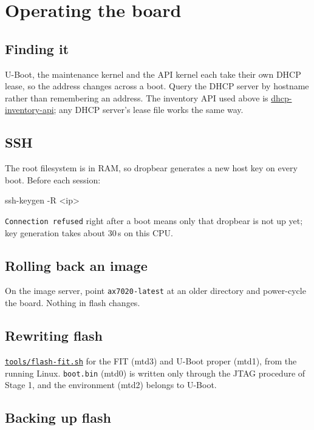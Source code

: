 \documentclass[11pt,a4paper,oneside]{article}
\newcommand{\file}[1]{{\color{bluemid}\nolinkurl{#1}}}
\newcommand{\cmd}[1]{\texttt{#1}}
\newcommand{\repo}{https://github.com/MaxClerkwell/ax7020-bringup}
\newcommand{\rfile}[1]{\href{\repo/blob/master/#1}{\color{bluemid}\nolinkurl{#1}}}
\begin{document}
\section{Operating the board}

\subsection{Finding it}

U-Boot, the maintenance kernel and the API kernel each take their own DHCP
lease, so the address changes across a boot. Query the DHCP server by
hostname rather than remembering an address. The inventory API used above is
\href{https://github.com/MaxClerkwell/dhcp-inventory-api}{dhcp-inventory-api};
any DHCP server's lease file works the same way.

\subsection{SSH}

The root filesystem is in RAM, so dropbear generates a new host key on every
boot. Before each session:

\begin{shell}
ssh-keygen -R <ip>
\end{shell}

\cmd{Connection refused} right after a boot means only that dropbear is not
up yet; key generation takes about 30\,s on this CPU.

\subsection{Rolling back an image}

On the image server, point \file{ax7020-latest} at an older directory and
power-cycle the board. Nothing in flash changes.

\subsection{Rewriting flash}

\rfile{tools/flash-fit.sh} for the FIT (mtd3) and U-Boot proper (mtd1), from
the running Linux. \file{boot.bin} (mtd0) is written only through the JTAG
procedure of Stage 1, and the environment (mtd2) belongs to U-Boot.

\subsection{Backing up flash}
\end{document}
